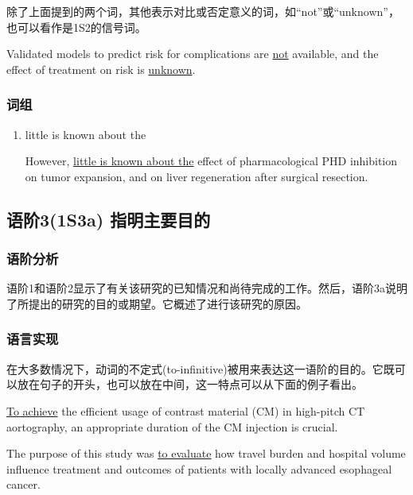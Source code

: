 \documentclass[a4paper]{ctexbook}
\begin{document}
    除了上面提到的两个词，其他表示对比或否定意义的词，如“not”或“unknown”，也可以看作是1S2的信号词。

    \begin{eg}{}
      Validated models to predict risk for complications are \uline{not} available, and the effect of treatment on risk is \uline{unknown}.
    \end{eg}

    \subsubsection{词组}

    \begin{enumerate}
      \item little is known about the
      \begin{eg}{}
        However, \uline{little is known about the} effect of pharmacological PHD inhibition on tumor expansion, and on liver regeneration after surgical resection.
      \end{eg}
    \end{enumerate}

  \subsection{语阶3(1S3a) 指明主要目的}

    \subsubsection{语阶分析}

    语阶1和语阶2显示了有关该研究的已知情况和尚待完成的工作。然后，语阶3a说明了所提出的研究的目的或期望。它概述了进行该研究的原因。

    \subsubsection{语言实现}

    在大多数情况下，动词的不定式(to-infinitive)被用来表达这一语阶的目的。它既可以放在句子的开头，也可以放在中间，这一特点可以从下面的例子看出。

    \begin{eg}{}
      \uline{To achieve} the efficient usage of contrast material (CM) in high-pitch CT aortography, an appropriate duration of the CM injection is crucial.
    \end{eg}

    \begin{eg}{}
      The purpose of this study was \uline{to evaluate} how travel burden and hospital volume influence treatment and outcomes of patients with locally advanced esophageal cancer.
    \end{eg}
\end{document}
